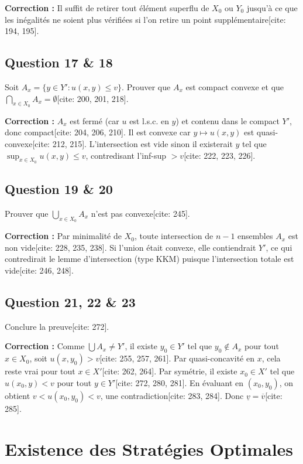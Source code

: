 \textbf{Correction :}
Il suffit de retirer tout élément superflu de $X_0$ ou $Y_0$ jusqu'à ce que les inégalités ne soient plus vérifiées si l'on retire un point supplémentaire[cite: 194, 195].

\subsection*{Question 17 \& 18}
Soit $A_x = \{y \in Y' : u(x, y) \le v\}$. Prouver que $A_x$ est compact convexe et que $\bigcap_{x \in X_0} A_x = \emptyset$[cite: 200, 201, 218].

\textbf{Correction :}
$A_x$ est fermé (car $u$ est l.s.c. en $y$) et contenu dans le compact $Y'$, donc compact[cite: 204, 206, 210]. Il est convexe car $y \mapsto u(x, y)$ est quasi-convexe[cite: 212, 215]. L'intersection est vide sinon il existerait $y$ tel que $\sup_{x \in X_0} u(x, y) \le v$, contredisant l'inf-sup $> v$[cite: 222, 223, 226].

\subsection*{Question 19 \& 20}
Prouver que $\bigcup_{x \in X_0} A_x$ n'est pas convexe[cite: 245].

\textbf{Correction :}
Par minimalité de $X_0$, toute intersection de $n-1$ ensembles $A_x$ est non vide[cite: 228, 235, 238]. Si l'union était convexe, elle contiendrait $Y'$, ce qui contredirait le lemme d'intersection (type KKM) puisque l'intersection totale est vide[cite: 246, 248].

\subsection*{Question 21, 22 \& 23}
Conclure la preuve[cite: 272].

\textbf{Correction :}
Comme $\bigcup A_x \neq Y'$, il existe $y_0 \in Y'$ tel que $y_0 \notin A_x$ pour tout $x \in X_0$, soit $u(x, y_0) > v$[cite: 255, 257, 261]. Par quasi-concavité en $x$, cela reste vrai pour tout $x \in X'$[cite: 262, 264]. Par symétrie, il existe $x_0 \in X'$ tel que $u(x_0, y) < v$ pour tout $y \in Y'$[cite: 272, 280, 281]. En évaluant en $(x_0, y_0)$, on obtient $v < u(x_0, y_0) < v$, une contradiction[cite: 283, 284]. Donc $\underline{v} = \overline{v}$[cite: 285].

\section*{Existence des Stratégies Optimales}

